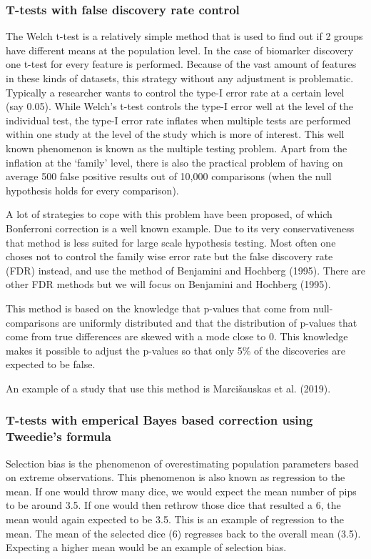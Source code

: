 \documentclass[
]{article}
\begin{document}
\hypertarget{intro-FDR}{%
\subsubsection{T-tests with false discovery rate control}\label{intro-FDR}}

The Welch t-test is a relatively simple method that is used to find out if 2 groups have different means at the population level. In the case of biomarker discovery one t-test for every feature is performed. Because of the vast amount of features in these kinds of datasets, this strategy without any adjustment is problematic. Typically a researcher wants to control the type-I error rate at a certain level (say 0.05). While Welch's t-test controls the type-I error well at the level of the individual test, the type-I error rate inflates when multiple tests are performed within one study at the level of the study which is more of interest. This well known phenomenon is known as the multiple testing problem. Apart from the inflation at the `family' level, there is also the practical problem of having on average 500 false positive results out of 10,000 comparisons (when the null hypothesis holds for every comparison).

A lot of strategies to cope with this problem have been proposed, of which Bonferroni correction is a well known example. Due to its very conservativeness that method is less suited for large scale hypothesis testing. Most often one choses not to control the family wise error rate but the false discovery rate (FDR) instead, and use the method of Benjamini and Hochberg (1995). There are other FDR methods but we will focus on Benjamini and Hochberg (1995).

This method is based on the knowledge that p-values that come from null-comparisons are uniformly distributed and that the distribution of p-values that come from true differences are skewed with a mode close to 0. This knowledge makes it possible to adjust the p-values so that only 5\% of the discoveries are expected to be false.

An example of a study that use this method is Marcišauskas et al. (2019).

\hypertarget{intro-Tweedie}{%
\subsubsection{T-tests with emperical Bayes based correction using Tweedie's formula}\label{intro-Tweedie}}

Selection bias is the phenomenon of overestimating population parameters based on extreme observations. This phenomenon is also known as regression to the mean. If one would throw many dice, we would expect the mean number of pips to be around 3.5. If one would then rethrow those dice that resulted a 6, the mean would again expected to be 3.5. This is an example of regression to the mean. The mean of the selected dice (6) regresses back to the overall mean (3.5). Expecting a higher mean would be an example of selection bias.
\end{document}
